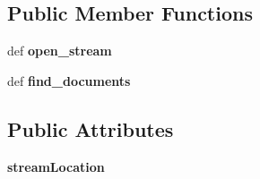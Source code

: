 \subsection*{Public Member Functions}
\begin{DoxyCompactItemize}
\item 
\hypertarget{classcheshire3_1_1textmining_1_1document_factory_1_1_enju_record_document_stream_a08fe494f68bcf7e45c173478aca6d386}{def {\bfseries open\-\_\-stream}}\label{classcheshire3_1_1textmining_1_1document_factory_1_1_enju_record_document_stream_a08fe494f68bcf7e45c173478aca6d386}

\item 
\hypertarget{classcheshire3_1_1textmining_1_1document_factory_1_1_enju_record_document_stream_a8294b8542f6bd686743ff3d407b05f8d}{def {\bfseries find\-\_\-documents}}\label{classcheshire3_1_1textmining_1_1document_factory_1_1_enju_record_document_stream_a8294b8542f6bd686743ff3d407b05f8d}

\end{DoxyCompactItemize}
\subsection*{Public Attributes}
\begin{DoxyCompactItemize}
\item 
\hypertarget{classcheshire3_1_1textmining_1_1document_factory_1_1_enju_record_document_stream_a07f611fe8a6ab10ad9bc3b0004f2a3f0}{{\bfseries stream\-Location}}\label{classcheshire3_1_1textmining_1_1document_factory_1_1_enju_record_document_stream_a07f611fe8a6ab10ad9bc3b0004f2a3f0}

\end{DoxyCompactItemize}
